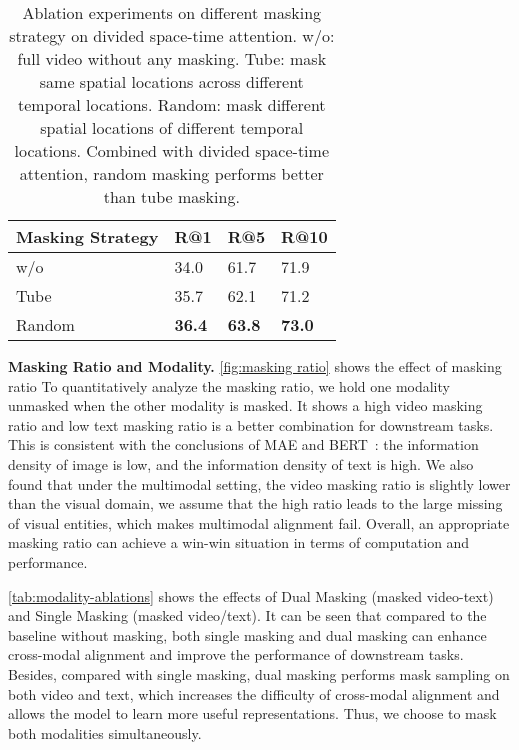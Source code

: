 \documentclass[10pt,twocolumn,letterpaper]{article}
\begin{document}
\begin{table}[h]
    \centering
    \small
    \begin{tabular}{@{}l|lll@{}}
    \toprule
    \textbf{Masking Strategy}  & \textbf{R@1}   & \textbf{R@5}    & \textbf{R@10}     \\ \midrule
    w/o    & 34.0 & 61.7 & 71.9 \\
    Tube  &   35.7     &  62.1      & 71.2       \\ 
    Random    &  \textbf{36.4}  &    \textbf{63.8}    &    \textbf{73.0}    \\ \bottomrule
    \end{tabular}
    \caption{Ablation experiments on different masking strategy on divided space-time attention. w/o: full video without any masking. Tube: mask same spatial locations across different temporal locations. Random: mask different spatial locations of different temporal locations. Combined with divided space-time attention, random masking performs better than tube masking.}
    \vspace{-2mm}
    \label{tab:maskingtype-ablations}
    \end{table}


\vspace{1mm}\noindent\textbf{Masking Ratio and Modality.} \cref{fig:masking ratio} shows the effect of masking ratio To quantitatively analyze the masking ratio, we hold one modality unmasked when the other modality is masked. It shows a high video masking ratio and low text masking ratio is a better combination for downstream tasks. This is consistent with the conclusions of MAE\cite{mae} and BERT~\cite{beit}: the information density of image is low, and the information density of text is high. We also found that under the multimodal setting, the video masking ratio is slightly lower than the visual domain, we assume that the high ratio leads to the large missing of visual entities, which makes multimodal alignment fail. Overall, an appropriate masking ratio can achieve a win-win situation in terms of computation and performance.

\cref{tab:modality-ablations} shows the effects of Dual Masking (masked video-text) and Single Masking (masked video/text). It can be seen that compared to the baseline without masking, both single masking and dual masking can enhance cross-modal alignment and improve the performance of downstream tasks. Besides, compared with single masking, dual masking performs mask sampling on both video and text, which increases the difficulty of cross-modal alignment and allows the model to learn more useful representations. Thus, we choose to mask both modalities simultaneously.
\end{document}
